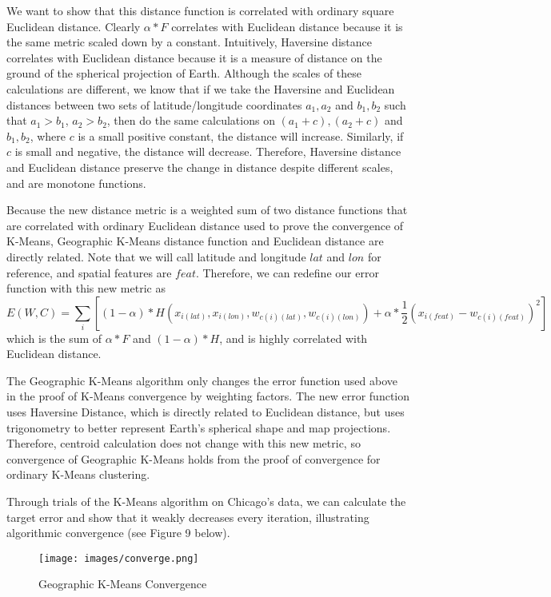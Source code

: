 \documentclass[times new roman,12pt]{article}
\begin{document}
We want to show that this distance function is correlated with ordinary square Euclidean distance. Clearly $\alpha*F$ correlates with Euclidean distance because it is the same metric scaled down by a constant. Intuitively, Haversine distance correlates with Euclidean distance because it is a measure of distance on the ground of the spherical projection of Earth. Although the scales of these calculations are different, we know that if we take the Haversine and Euclidean distances between two sets of latitude/longitude coordinates $a_1, a_2$ and $b_1, b_2$ such that $a_1>b_1$, $a_2>b_2$, then do the same calculations on $(a_1 + c), (a_2+c)$ and $b_1, b_2$, where $c$ is a small positive constant, the distance will increase. Similarly, if $c$ is small and negative, the distance will decrease. Therefore, Haversine distance and Euclidean distance preserve the change in distance despite different scales, and are monotone functions. 

Because the new distance metric is a weighted sum of two distance functions that are correlated with ordinary Euclidean distance used to prove the convergence of K-Means, Geographic K-Means distance function and Euclidean distance are directly related. Note that we will call latitude and longitude $lat$ and $lon$ for reference, and spatial features are $feat$. Therefore, we can redefine our error function with this new metric as $$E(W,C) = \sum_i{[(1-\alpha)*H(x_{i(lat)}, x_{i(lon)}, w_{c(i)(lat)}, w_{c(i)(lon)})+\alpha*\frac{1}{2}(x_{i(feat)}-w_{c(i)(feat)})^2]}$$ which is the sum of $\alpha*F$ and $(1-\alpha)*H$, and is highly correlated with Euclidean distance.

The Geographic K-Means algorithm only changes the error function used above in the proof of K-Means convergence by weighting factors. The new error function uses Haversine Distance, which is directly related to Euclidean distance, but uses trigonometry to better represent Earth's spherical shape and map projections. Therefore, centroid calculation does not change with this new metric, so convergence of Geographic K-Means holds from the proof of convergence for ordinary K-Means clustering.  

\vspace{10mm}

Through trials of the K-Means algorithm on Chicago's data, we can calculate the target error and show that it weakly decreases every iteration, illustrating algorithmic convergence (see Figure 9 below).

\begin{figure}[H]
\centering
\caption{Geographic K-Means Convergence}
  \texttt{[image: images/converge.png]}
  \label{fig:converge}
\end{figure}
\end{document}
